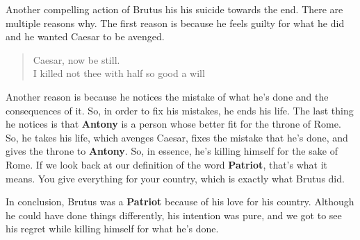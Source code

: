 Another compelling action of Brutus his his suicide towards the end. There are
multiple reasons why. The first reason is because he feels guilty for what he
did and he wanted Caesar to be avenged.

\begin{center}
  \begin{quotation}
    Caesar, now be still. \\
    I killed not thee with half so good a will
  \end{quotation}
\end{center}

\noindent Another reason is because he notices the mistake of what he's done and
the consequences of it. So, in order to fix his mistakes, he ends his life. The
last thing he notices is that \textbf{Antony} is a person whose better fit for
the throne of Rome. So, he takes his life, which avenges Caesar, fixes the
mistake that he's done, and gives the throne to \textbf{Antony}. So, in essence,
he's killing himself for the sake of Rome. If we look back at our definition of
the word \textbf{Patriot}, that's what it means. You give everything for your
country, which is exactly what Brutus did.

In conclusion, Brutus was a \textbf{Patriot} because of his love for his
country. Although he could have done things differently, his intention was pure,
and we got to see his regret while killing himself for what he's done.

